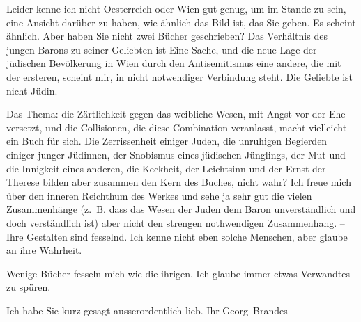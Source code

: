 \pstart
           Leider kenne ich nicht Oesterreich oder Wien gut genug, um im Stande zu sein, eine Ansicht
               darüber zu haben, wie ähnlich das Bild ist, das Sie geben. Es scheint ähnlich. Aber
               haben Sie nicht zwei Bücher geschrieben? Das Verhältnis des jungen Barons zu seiner Geliebten ist Eine Sache,
               und die {\pb}neue Lage der jüdischen
               Bevölkerung in Wien durch den Antisemitismus eine
               andere, die mit der ersteren, scheint mir, in nicht notwendiger Verbindung steht. Die
               Geliebte ist nicht Jüdin.\pend
           
\pstart
           Das Thema: die Zärtlichkeit gegen das weibliche Wesen, mit Angst vor der Ehe
               versetzt, und die Collisionen, die diese Combination veranlasst,  macht vielleicht ein Buch für sich. Die
               Zerrissenheit einiger Juden, die unruhigen Begierden einiger junger Jüdinnen, der
               Snobismus eines jüdischen Jünglings, der {\pb}Mut und die Innigkeit eines
               anderen, die Keckheit, der Leichtsinn und der Ernst der Therese bilden aber zusammen den Kern des
               Buches, nicht wahr? Ich freue mich über den inneren Reichthum des Werkes und sehe ja
               sehr gut die vielen Zusammenhänge (z. B. dass das Wesen der Juden dem Baron
               unverständlich und doch verständlich ist) aber nicht den strengen nothwendigen
               Zusammenhang. – Ihre Gestalten sind fesselnd. Ich kenne nicht eben solche Menschen,
               aber glaube an ihre Wahrheit.\pend
           
\pstart
           Wenige Bücher fesseln mich wie die ihrigen. Ich glaube immer etwas Verwandtes zu
               spüren.\pend
           
\pstart
           Ich habe Sie kurz gesagt ausserordentlich lieb.\pend
           \pstart Ihr \spacefill\mbox{Georg Brandes}\pend{}\endnumbering{}  
      